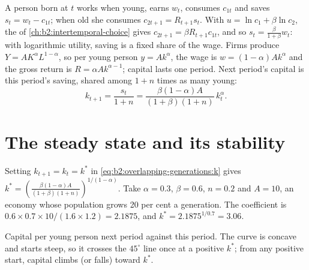 A person born at $t$ works when young, earns $w_t$, consumes $c_{1t}$ and saves $s_t = w_t - c_{1t}$; when old she consumes $c_{2t+1} = R_{t+1}s_t$. With $u = \ln c_1 + \beta\ln c_2$, the  of \cref{ch:b2:intertemporal-choice} gives
$c_{2t+1} = \beta R_{t+1}c_{1t}$, and so $s_t = \frac{\beta}{1 + \beta}w_t$: with logarithmic utility, saving is a fixed share of the wage. Firms produce $Y = AK^\alpha L^{1-\alpha}$, so per young person $y = Ak^\alpha$, the wage is $w = (1 - \alpha)Ak^\alpha$ and the
gross return is $R = \alpha Ak^{\alpha - 1}$; capital lasts one period. Next period's capital is this period's saving, shared among $1 + n$ times as many young:
\begin{equation}\label{eq:b2:overlapping-generations:k}
k_{t+1} = \frac{s_t}{1 + n} = \frac{\beta(1 - \alpha)A}{(1 + \beta)(1 + n)}\,k_t^\alpha.
\end{equation}

\section{The steady state and its stability}\label{sec:b2:overlapping-generations:steady}

Setting $k_{t+1} = k_t = k^*$ in \eqref{eq:b2:overlapping-generations:k} gives $k^* = \left(\frac{\beta(1 - \alpha)A}{(1 + \beta)(1 + n)}\right)^{1/(1-\alpha)}$. Take $\alpha = 0.3$, $\beta = 0.6$, $n = 0.2$ and $A = 10$, an economy whose population grows 20 per cent a
generation. The coefficient is $0.6 \times 0.7 \times 10/(1.6 \times 1.2) = 2.1875$, and $k^* = 2.1875^{1/0.7} = 3.06$.

\begin{omfigure}

{\small Capital per young person next period against this period. The curve is concave and starts steep, so it crosses the
$45^\circ$ line once at a positive $k^*$; from any positive start, capital climbs (or falls) toward $k^*$.}
\end{omfigure}

